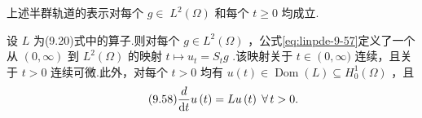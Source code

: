 上述半群轨道的表示对每个 $g \in \; {L}^{2}\left( \Omega \right)$ 和每个 $t \geq  0$ 均成立.

\begin{lemma}\label{lem:linpde-9-19}
设 $L$ 为(9.20)式中的算子.则对每个 $g \in  {L}^{2}\left( \Omega \right)$ ，公式\eqref{eq:linpde-9-57}定义了一个从 $(0,\infty )$ 到 ${L}^{2}\left( \Omega \right)$ 的映射 $t \mapsto  {u}_{t} = {S}_{t}g$ .该映射关于 $t \in  \left(  {0,\infty ) }\right.$ 连续，且关于 $t > 0$ 连续可微.此外，对每个 $t > 0$ 均有 $u\left( t\right)  \in  \operatorname{Dom}\left( L\right)  \subseteq  {H}_{0}^{1}\left( \Omega \right)$ ，且
\begin{equation}\tag{9.58}\label{eq:linpde-9-58}
\frac{d}{\mathop{}\!\mathrm{d} t}u\left( t\right)  = {Lu}\left( t\right) \;\forall\,t > 0.
\end{equation}
\end{lemma}

